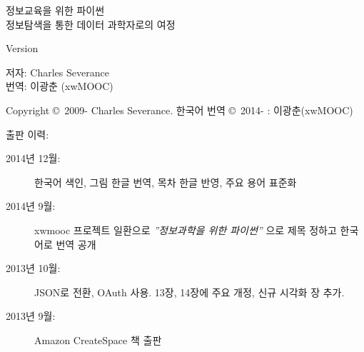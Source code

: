



\newtheorem{ex}{Exercise}[chapter]

\begin{latexonly}

\renewcommand{\blankpage}{\thispagestyle{empty} \quad \newpage}

\thispagestyle{empty}

\begin{flushright}
\vspace*{2.0in}


\begin{spacing}{3}
{\huge 정보교육을 위한 파이썬}\\
{\large 정보탐색을 통한 데이터 과학자로의 여정}
\end{spacing}

\vspace{0.25in}

Version \theversion

\vspace{0.5in}


{\Large
저자: Charles Severance\\
번역: 이광춘 (xwMOOC)
}

\vfill

\end{flushright}

\pagebreak
\thispagestyle{empty}

{\small
Copyright \copyright ~2009- Charles Severance.
한국어 번역 \copyright ~2014- : 이광춘(xwMOOC)

출판 이력:

\begin{description}

\item[2014년 12월:] 한국어 색인, 그림 한글 번역, 목차 한글 반영, 주요 용어 표준화

\item[2014년 9월:] xwmooc 프로젝트 일환으로 \emph{''정보과학을 위한 파이썬''} 으로 제목 정하고 한국어로 번역 공개

\item[2013년 10월:] JSON로 전환, OAuth 사용. 13장, 14장에 주요 개정, 신규 시각화 장 추가.

\item[2013년 9월:] Amazon CreateSpace 책 출판


\end{description}}
\end{latexonly}
